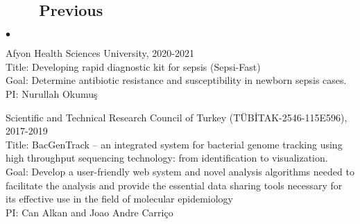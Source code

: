 \documentclass[margin,line]{res}
\newenvironment{list2}{
  \begin{list}{$\bullet$}{%
      \setlength{\itemsep}{0.1cm}
      \setlength{\parsep}{0in} \setlength{\parskip}{0in}
      \setlength{\topsep}{0in} \setlength{\partopsep}{0in} 
      \setlength{\leftmargin}{0.2in}}}{\end{list}}
\begin{document}
\begin{resume}
\vspace{-0.5cm}
                                       \subsection{\small \sc ~~~~Previous}
                                       \begin{list2}
                                       
                                       \item
        Afyon Health Sciences University, 2020-2021\\
        Title: Developing rapid diagnostic kit for sepsis (Sepsi-Fast)\\
        Goal: Determine antibiotic resistance and susceptibility in newborn sepsis cases.\\
        PI: Nurullah Okumuş
                                       \item
                                         Scientific and Technical Research Council of Turkey (T\"{U}B\.{I}TAK-2546-115E596), 2017-2019\\
                                         Title: BacGenTrack – an integrated system for bacterial genome tracking using high throughput sequencing technology: from identification to visualization.\\
                                         Goal: Develop a user-friendly web system and novel analysis algorithms needed to facilitate the analysis and provide
                                         the essential data sharing tools necessary for its effective use in the field of molecular epidemiology\\
                                         PI: Can Alkan and Joao Andre Carriço


\end{list2}
\end{resume}
\end{document}

